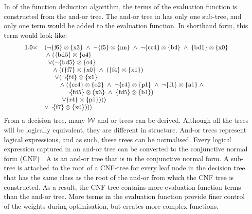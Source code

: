 \documentclass[twoside,11pt]{article}
\begin{document}
In  of the function deduction algorithm, the terms of the evaluation function is constructed from the and-or tree.   The and-or tree in  has only one sub-tree, and only one term would be added to the evaluation function.  In shorthand form, this term would look like:
\[
\small
\begin{array}{ll}
 1.0 \times &
( 
\neg  \{ \mbox{f6} \} \otimes \{ \mbox{x3} \} 
\;\wedge\; \neg \{ \mbox{f5} \} \otimes \{ \mbox{nn} \} 
\;\wedge\; \neg \{ \mbox{cc4} \} \otimes \{ \mbox{b4} \} 
\;\wedge\; \{ \mbox{bd1} \} \otimes \{ \mbox{x0} \} 
\\ &  \;\wedge\; 
	( \{ \mbox{bd5} \} \otimes \{ \mbox{o4} \} 
\\ & \;\;	\vee	
		( \neg \{ \mbox{bd5} \} \otimes \{ \mbox{o4} \} 
\\ &	\;\; \;\;	\;\wedge\; 	( 
				(\{ \mbox{f7} \} \otimes \{ \mbox{x0} \} 
				\;\wedge\; 
					(\{ \mbox{f4} \} \otimes \{ \mbox{x1} \}) 
\\ &	\;\; \;\;	 \;\;			\vee 
					( \neg \{ \mbox{f4} \} \otimes \{ \mbox{x1} \} 
\\ &	\;\; \;\;	 \;\;	\;\;	\;\wedge\; 
							(\{ \mbox{cc4} \} \otimes \{ \mbox{o2} \} 
							\;\wedge\; \neg \{ \mbox{r4} \} \otimes \{ \mbox{p1} \} 
							\;\wedge\; \neg \{ \mbox{f1} \} \otimes \{ \mbox{a1} \}  
							\;\wedge\; 
\\ &	\;\; \;\;	 \;\;	\;\; \;\; \;\;	\neg \{ \mbox{fd5} \} \otimes \{ \mbox{x3} \} 
							\;\wedge\; \{ \mbox{fd5} \} \otimes \{ \mbox{b1} \}
							) 
\\ &	\;\; \;\;	 \;\;	\;\; \;\;	\vee \{ \mbox{r4} \} \otimes \{ \mbox{p1} \}))) 
\\ \;\; &	\vee  
			 \neg \{ \mbox{f7} \} \otimes \{ \mbox{x0} \}
		)))\\
\end{array}
\]				
From a decision tree, many ${\cal W}$ and-or trees can be derived.  Although all the trees will be logically equivalent, they are different in structure.  And-or trees represent logical expressions, and as such, these trees can be normalised.  Every logical expression captured in an and-or tree can be converted to the conjunctive normal form (CNF) \cite{hamilton88}. A  is an and-or tree that is in the conjunctive normal form.  A sub-tree is attached to the root of a CNF-tree for every leaf node in the decision tree that has the same class as the root of the and-or from which the CNF tree is constructed. As a  result, the CNF tree contains more evaluation function terms than the and-or tree. More terms in the evaluation function provide finer control of the weights during optimisation,  but creates more complex functions. 
\end{document}
